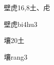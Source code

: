 \begin{entry}{壁虎}{16,8}{⼟、⾌}
  \begin{phonetics}{壁虎}{bi4hu3}
  \end{phonetics}
\end{entry}

\begin{entry}{壤}{20}{⼟}
  \begin{phonetics}{壤}{rang3}
  \end{phonetics}
\end{entry}


